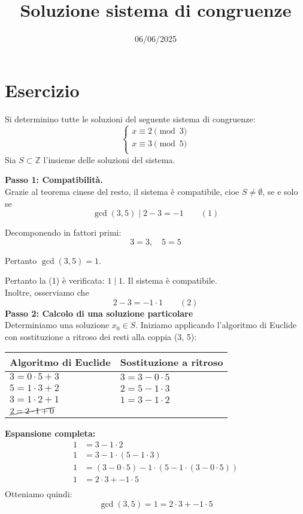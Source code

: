 \documentclass[12pt]{article}
\begin{document}
\title{Soluzione sistema di congruenze}
\date{06/06/2025}
\maketitle
\section*{Esercizio}
Si determinino tutte le soluzioni del seguente sistema di congruenze:
\[
\begin{cases}
x \equiv 2 \pmod{3} \\
x \equiv 3 \pmod{5} \\
\end{cases}
\]
Sia $S \subset \mathbb{Z}$ l'insieme delle soluzioni del sistema.

\textbf{Passo 1: Compatibilità.} \\ 
Grazie al teorema cinese del resto, il sistema è compatibile, cioe $S \neq \emptyset$, se e solo se
$$\gcd(3, 5) \mid 2 - 3 = -1 \qquad (1)$$

Decomponendo in fattori primi:
$$3 = 3, \quad 5 = 5$$

Pertanto $\gcd(3, 5) = 1$.

Pertanto la (1) è verificata: $1 \mid 1$. Il sistema è compatibile.\\
Inoltre, osserviamo che $$2 - 3 = -1 \cdot 1 \qquad (2)$$
\textbf{Passo 2: Calcolo di una soluzione particolare} \\
Determiniamo una soluzione $x_0 \in S$.
Iniziamo applicando l'algoritmo di Euclide con sostituzione a ritroso dei resti alla coppia (3, 5):
\begin{center}
\setlength{\arrayrulewidth}{0.5pt}
\begin{tabular}{|p{5cm}|p{9cm}|}
\hline
\textbf{Algoritmo di Euclide} & \textbf{Sostituzione a ritroso} \\
\hline
$3 = 0 \cdot  5 + 3$ & $3 = 3 - 0 \cdot  5$ \\
\hline
$5 = 1 \cdot  3 + 2$ & $2 = 5 - 1 \cdot  3$ \\
\hline
$3 = 1 \cdot  2 + 1$ & $1 = 3 - 1 \cdot  2$ \\
\hline
$\cancel{2 = 2 \cdot  1 + 0}$ & \\
\hline
\end{tabular}
\end{center}
\textbf{Espansione completa:}
\begin{align*}
1 &= 3 - 1\cdot2\\
1 &= 3 - 1\cdot(5 - 1\cdot3)\\
1 &= (3 - 0\cdot5) - 1\cdot(5 - 1\cdot(3 - 0\cdot5))\\
1 &= 2\cdot3 + -1\cdot5\\
\end{align*}
Otteniamo quindi: $$\gcd(3, 5) = 1 = 2 \cdot 3 + -1 \cdot 5$$
\end{document}
